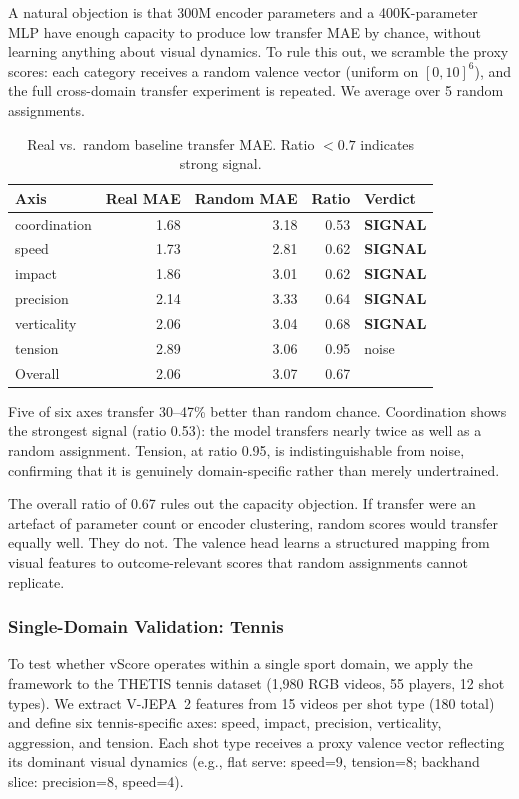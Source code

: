\documentclass[11pt]{article}
\begin{document}
A natural objection is that 300M encoder parameters and a 400K-parameter MLP have enough capacity to produce low transfer MAE by chance, without learning anything about visual dynamics. To rule this out, we scramble the proxy scores: each category receives a random valence vector (uniform on $[0, 10]^6$), and the full cross-domain transfer experiment is repeated. We average over 5 random assignments.

\begin{table}[ht]
\centering
\caption{Real vs.\ random baseline transfer MAE. Ratio $< 0.7$ indicates strong signal.}
\begin{tabular}{lrrrl}
\toprule
Axis & Real MAE & Random MAE & Ratio & Verdict \\
\midrule
coordination & 1.68 & 3.18 & 0.53 & \textbf{SIGNAL} \\
speed & 1.73 & 2.81 & 0.62 & \textbf{SIGNAL} \\
impact & 1.86 & 3.01 & 0.62 & \textbf{SIGNAL} \\
precision & 2.14 & 3.33 & 0.64 & \textbf{SIGNAL} \\
verticality & 2.06 & 3.04 & 0.68 & \textbf{SIGNAL} \\
tension & 2.89 & 3.06 & 0.95 & noise \\
\midrule
Overall & 2.06 & 3.07 & 0.67 & \\
\bottomrule
\end{tabular}
\label{tab:random_baseline}
\end{table}

Five of six axes transfer 30--47\% better than random chance. Coordination shows the strongest signal (ratio 0.53): the model transfers nearly twice as well as a random assignment. Tension, at ratio 0.95, is indistinguishable from noise, confirming that it is genuinely domain-specific rather than merely undertrained.

The overall ratio of 0.67 rules out the capacity objection. If transfer were an artefact of parameter count or encoder clustering, random scores would transfer equally well. They do not. The valence head learns a structured mapping from visual features to outcome-relevant scores that random assignments cannot replicate.

\subsubsection{Single-Domain Validation: Tennis}

To test whether vScore operates within a single sport domain, we apply the framework to the THETIS tennis dataset (1,980 RGB videos, 55 players, 12 shot types). We extract V-JEPA~2 features from 15 videos per shot type (180 total) and define six tennis-specific axes: speed, impact, precision, verticality, aggression, and tension. Each shot type receives a proxy valence vector reflecting its dominant visual dynamics (e.g., flat serve: speed=9, tension=8; backhand slice: precision=8, speed=4).
\end{document}
